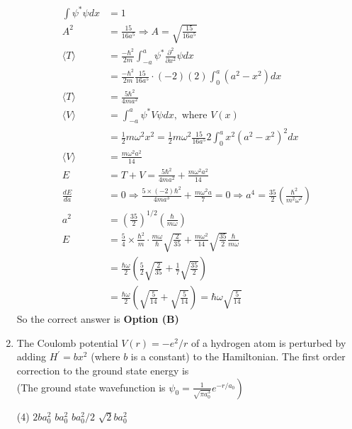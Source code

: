 \begin{enumerate}
\begin{answer}
$$\begin{aligned}
\int \psi^{*} \psi d x&=1\\
A^{2}&=\frac{15}{16 a^{5}} \Rightarrow A=\sqrt{\frac{15}{16 a^{5}}}\\
\langle T\rangle&=\frac{-\hbar^{2}}{2 m} \int_{-a}^{a} \psi^{*} \frac{\partial^{2}}{\partial x^{2}} \psi d x\\&=\frac{-\hbar^{2}}{2 m} \frac{15}{16 a^{5}} \cdot(-2)(2) \int_{0}^{a}\left(a^{2}-x^{2}\right) d x\\
\langle T\rangle&=\frac{5 \hbar^{2}}{4 m a^{2}}\\
\langle V\rangle&=\int_{-a}^{a} \psi^{*} V \psi d x,\text{ where }V(x)\\&=\frac{1}{2} m \omega^{2} x^{2}=\frac{1}{2} m \omega^{2} \frac{15}{16 a^{5}} 2 \int_{0}^{a} x^{2}\left(a^{2}-x^{2}\right)^{2} d x\\
\langle V\rangle&=\frac{m \omega^{2} a^{2}}{14}\\
E&=T+V=\frac{5 \hbar^{2}}{4 m a^{2}}+\frac{m \omega^{2} a^{2}}{14}\\
\frac{d E}{d a}&=0 \Rightarrow \frac{5 \times(-2) \hbar^{2}}{4 m a^{3}}+\frac{m \omega^{2} a}{7}=0 \Rightarrow a^{4}=\frac{35}{2}\left(\frac{\hbar^{2}}{m^{2} \omega^{2}}\right)\\
a^{2}&=\left(\frac{35}{2}\right)^{1 / 2}\left(\frac{\hbar}{m \omega}\right)\\
E&=\frac{5}{4} \times \frac{\hbar^{2}}{m} \cdot \frac{m \omega}{\hbar} \sqrt{\frac{2}{35}}+\frac{m \omega^{2}}{14} \sqrt{\frac{35}{2}} \frac{\hbar}{m \omega}\\
&=\frac{\hbar \omega}{2}\left(\frac{5}{2} \sqrt{\frac{2}{35}}+\frac{1}{7} \sqrt{\frac{35}{2}}\right)\\&=\frac{\hbar \omega}{2}\left(\sqrt{\frac{5}{14}}+\sqrt{\frac{5}{14}}\right)=\hbar \omega \sqrt{\frac{5}{14}}
\end{aligned}
$$
So the correct answer is \textbf{Option (B)}
\end{answer}
\item  The Coulomb potential $V(r)=-e^{2} / r$ of a hydrogen atom is perturbed by adding $H^{\prime}=b x^{2}$ (where $b$ is a constant) to the Hamiltonian. The first order correction to the ground state energy is\\
(The ground state wavefunction is $\left.\psi_{0}=\frac{1}{\sqrt{\pi a_{0}^{3}}} e^{-r / a_{0}}\right)$
{}
\begin{tasks}(4)
\task[\textbf{A.}] $2 b a_{0}^{2}$
\task[\textbf{B.}] $b a_{0}^{2}$
\task[\textbf{C.}] $b a_{0}^{2} / 2$
\task[\textbf{D.}] $\sqrt{2} b a_{0}^{2}$

\end{tasks}
\end{enumerate}

